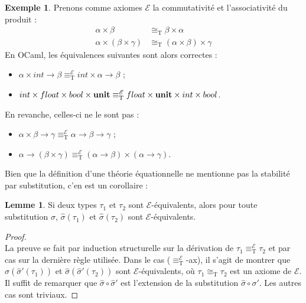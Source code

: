 \documentclass[a4paper]{report}
\newenvironment{preuve} 
  {\begin{proof}~\\} 
  {\end{proof}}
\theoremstyle{definition}
\newtheorem{lemme}[theoreme]{Lemme}
\newtheorem{exemple}[theoreme]{Exemple}
\newcommand{\unit}{\bold{unit}}
\newcommand{\E}{\mathscr{E}}
\newcommand{\T}{\mathrm{T}}
\begin{document}
\begin{exemple}
  Prenons comme axiomes $\E$ la commutativité et l'associativité du produit :
  \begin{align}
      \alpha \times \beta &\cong_\T
      \beta \times \alpha
      \tag{$\times$-comm}
    \\
      \alpha \times (\beta \times \gamma) &\cong_\T
      (\alpha \times \beta) \times \gamma
      \tag{$\times$-assoc}
  \end{align}
  En OCaml, les équivalences suivantes sont alors correctes :
  \begin{itemize}
    \item $\alpha \times int \rightarrow \beta \equiv_\T^\E int \times \alpha \rightarrow \beta$ ;
    \item $int \times float \times bool \times \unit \equiv_\T^\E float \times \unit \times int \times bool$.
  \end{itemize}
  En revanche, celles-ci ne le sont pas :
  \begin{itemize}
    \item $\alpha \times \beta \rightarrow \gamma \equiv_\T^\E \alpha \rightarrow \beta \rightarrow \gamma$ ;
    \item $\alpha \rightarrow (\beta \times \gamma) \equiv_\T^\E (\alpha \rightarrow \beta) \times (\alpha \rightarrow \gamma)$.
  \end{itemize}
\end{exemple}

Bien que la définition d'une théorie équationnelle ne mentionne pas la stabilité par substitution, c'en est un corollaire :

\begin{lemme}
  Si deux types $\tau_1$ et $\tau_2$ sont $\E$-équivalents, alors pour toute substitution $\sigma$, $\hat\sigma (\tau_1)$ et $\hat\sigma (\tau_2)$ sont $\E$-équivalents.
\end{lemme}

\begin{preuve}
  La preuve se fait par induction structurelle sur la dérivation de $\tau_1 \equiv_\T^\E \tau_2$ et par cas sur la dernière règle utilisée. Dans le cas ($\equiv_\T^\E$-ax), il s'agit de montrer que $\hat\sigma (\hat\sigma' (\tau_1))$ et $\hat\sigma (\hat\sigma' (\tau_2))$ sont $\E$-équivalents, où $\tau_1 \cong_\T \tau_2$ est un axiome de $\E$. Il suffit de remarquer que $\hat\sigma \circ \hat\sigma'$ est l'extension de la substitution $\hat\sigma \circ \sigma'$. Les autres cas sont triviaux.
\end{preuve}
\end{document}
